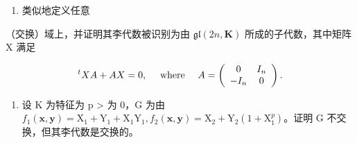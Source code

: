 \begin{enumerate}
\def\labelenumi{(\alph{enumi})}
\setcounter{enumi}{2}
\tightlist
\item
  类似地定义任意
\end{enumerate}

（交换）域上，并证明其李代数被识别为由 \(\mathfrak{gl}(2n,\mathbf{K})\) 所成的子代数，其中矩阵 X 满足

\[
{ } ^ { t } X A + A X = 0 , \quad \text {   where   } \quad A = \left( \begin{array} { c c } 0 & I _ { n } \\ - I _ { n } & 0 \end{array} \right) .
\]

\begin{enumerate}
\def\labelenumi{\arabic{enumi}.}
\setcounter{enumi}{26}
\tightlist
\item
  设 K 为特征为 p \textgreater{} 为 0，G 为由 \(f_{1}(\mathbf{x}, \mathbf{y}) = \mathrm{X}_{1} + \mathrm{Y}_{1} + \mathrm{X}_{1}\mathrm{Y}_{1}, f_{2}(\mathbf{x}, \mathbf{y}) = \mathrm{X}_{2} + \mathrm{Y}_{2}(1 + \mathrm{X}_{1}^{p})\)。证明 G 不交换，但其李代数是交换的。
\end{enumerate}

